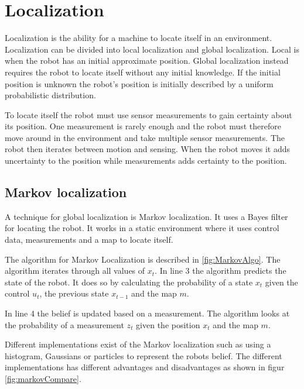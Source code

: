 \chapter{Localization}
\label{chp:local}

Localization is the ability for a machine to locate itself in an environment. Localization can be divided into local localization and global localization. Local is when the robot has an initial approximate position. Global localization instead requires the robot to locate itself without any initial knowledge. If the initial position is unknown the robot's position is initially described by a uniform probabilistic distribution. 

To locate itself the robot must use sensor measurements to gain certainty about its position. One measurement is rarely enough and the robot must therefore move around in the environment and take multiple sensor measurements. The robot then iterates between motion and sensing. When the robot moves it adds uncertainty to the position while measurements adds certainty to the position.
 
\section{Markov localization}
A technique for global localization is Markov localization. It uses a Bayes filter for locating the robot. It works in a static environment where it uses control data, measurements and a map to locate itself.

The algorithm for Markov Localization is described in \ref{fig:MarkovAlgo}. The algorithm iterates through all values of $x_t$. In line 3 the algorithm predicts the state of the robot. It does so by calculating the probability of a state $x_t$ given the control $u_t$, the previous state $x_{t-1}$ and the map $m$.

In line 4 the belief is updated based on a measurement. The algorithm looks at the probability of a measurement $z_t$ given the position $x_t$ and the map $m$.



Different implementations exist of the Markov localization such as using a histogram, Gaussians or particles to represent the robots belief. The different implementations has different advantages and disadvantages as shown in figur \ref{fig:markovCompare}. 



